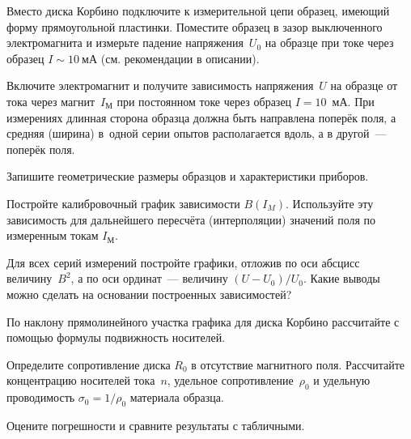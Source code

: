 \begin{lab:task}
\item Вместо диска Корбино подключите к измерительной цепи образец, имеющий
форму прямоугольной пластинки. Поместите образец в зазор выключенного 
электромагнита и измерьте падение напряжения~$U_0$ на образце 
при токе через образец $I\sim 10~мА$ (см. рекомендации в описании).

\item Включите электромагнит и получите зависимость напряжения~$U$ на образце от
тока через магнит~$I_{М}$ при постоянном токе через образец $I=10$~мА. 
При измерениях длинная сторона образца должна быть направлена поперёк поля, 
а средняя (ширина) в~одной серии опытов располагается вдоль, 
а в другой~--- поперёк поля.

\item Запишите геометрические размеры образцов и характеристики приборов.


\item Постройте калибровочный график зависимости $B(I_{M})$. 
    Используйте эту зависимость для дальнейшего пересчёта (интерполяции)
    значений поля по измеренным токам $I_{М}$.

\item Для всех серий измерений постройте графики, отложив по оси абсцисс
величину~$B^2$, а по оси ординат~--- величину $(U-U_0)/U_0$. Какие выводы
можно сделать на основании построенных зависимостей?

\item По наклону прямолинейного участка графика для диска Корбино рассчитайте
с помощью формулы  подвижность носителей.

\item Определите сопротивление диска $R_0$ в отсутствие магнитного поля.
Рассчитайте концентрацию носителей тока~$n$, удельное сопротивление~$\rho_0$ 
и удельную проводимость $\sigma_0=1/\rho_0$ материала образца.

\item Оцените погрешности и сравните результаты с табличными.

\end{lab:task}


